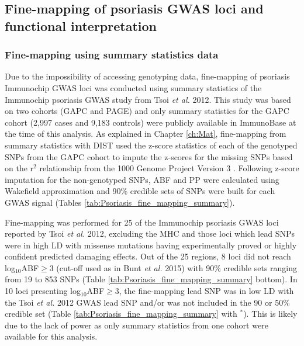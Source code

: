 \subsection{Fine-mapping of psoriasis GWAS loci and functional interpretation}

\subsubsection{Fine-mapping using summary statistics data}
Due to the impossibility of accessing genotyping data, fine-mapping of psoriasis Immunochip GWAS loci was conducted using summary statistics of the Immunochip psoriasis GWAS study from Tsoi \textit{et al.} 2012. This study was based on two cohorts (GAPC and PAGE) and only summary statistics for the GAPC cohort (2,997 cases and 9,183 controls) were publicly available in ImmunoBase at the time of this analysis. As explained in Chapter \ref{ch:Mat}, fine-mapping from summary statistics with DIST used the z-score statistics of each of the genotyped SNPs from the GAPC cohort to impute the z-scores for the missing SNPs based on the r$^2$ relationship from the 1000 Genome Project Version 3 \parencite{Lee2013}. Following z-score imputation for the non-genotyped SNPs, ABF and PP were calculated using Wakefield approximation and 90\% credible sets of SNPs were built for each GWAS signal (Tables \ref{tab:Psoriasis_fine_mapping_summary}).

Fine-mapping was performed for 25 of the Immunochip psoriasis GWAS loci reported by Tsoi \textit{et al.} 2012, excluding the MHC and those loci which lead SNPs were in high LD with missense mutations having experimentally proved or highly confident predicted damaging effects. Out of the 25 regions, 8 loci did not reach log$_{10}$ABF$\geq$3 (cut-off used as in Bunt \textit{et al.} 2015) with 90\% credible sets ranging from 19 to 853 SNPs (Table \ref{tab:Psoriasis_fine_mapping_summary} bottom). In 10 loci presenting log$_{10}$ABF$\geq$3, the fine-mapping lead SNP was in low LD with the Tsoi \textit{et al.} 2012 GWAS lead SNP and/or was not included in the 90 or 50\% credible set (Table \ref{tab:Psoriasis_fine_mapping_summary} with $^\ast$). This is likely due to the lack of power as only summary statistics from one cohort were available for this analysis.


